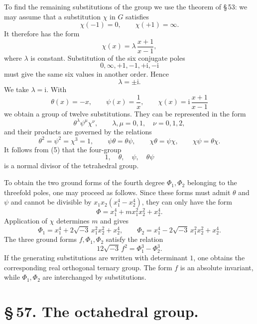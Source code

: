 \documentclass[11pt]{article}
\providecommand{\ii}{\mathrm{i}}
\begin{document}
To find the remaining substitutions of the group we use the theorem of \S\,53: we may assume that a substitution $\chi$ in $G$ satisfies
\[
 \chi(-1)=0,\qquad \chi(+1)=\infty.
\]
It therefore has the form
\begin{equation}
 \chi(x)=\lambda\,\frac{x+1}{x-1},
\tag{3}
\end{equation}
where $\lambda$ is constant. Substitution of the six conjugate poles
\[
0,\infty,+1,-1,+\ii,-\ii
\]
must give the same six values in another order. Hence
\[
 \lambda=\pm\ii .
\]
We take $\lambda=\ii$. With
\[
 \theta(x)=-x,\qquad \psi(x)=\frac1x,\qquad
 \chi(x)=\ii\,\frac{x+1}{x-1}
\]
we obtain a group of twelve substitutions. They can be represented in the form
\begin{equation}
 \theta^\lambda\psi^\mu\chi^\nu,\qquad
 \lambda,\mu=0,1,\quad \nu=0,1,2,
\tag{4}
\end{equation}
and their products are governed by the relations
\begin{equation}
 \theta^2=\psi^2=\chi^3=1,\qquad
 \psi\theta=\theta\psi,\qquad
 \chi\theta=\psi\chi,\qquad
 \chi\psi=\theta\chi .
\tag{5}
\end{equation}
It follows from (5) that the four-group
\begin{equation}
 1,\quad \theta,\quad \psi,\quad \theta\psi
\tag{6}
\end{equation}
is a normal divisor of the tetrahedral group.

To obtain the two ground forms of the fourth degree $\Phi_1,\Phi_2$ belonging to the threefold poles, one may proceed as follows. Since these forms must admit $\theta$ and $\psi$ and cannot be divisible by $x_1x_2(x_1^4-x_2^4)$, they can only have the form
\[
 \Phi=x_1^4+m x_1^2x_2^2+x_2^4 .
\]
Application of $\chi$ determines $m$ and gives
\begin{equation}
 \Phi_1=x_1^4+2\sqrt{-3}\,x_1^2x_2^2+x_2^4,\qquad
 \Phi_2=x_1^4-2\sqrt{-3}\,x_1^2x_2^2+x_2^4.
\tag{7}
\end{equation}
The three ground forms $f,\Phi_1,\Phi_2$ satisfy the relation
\begin{equation}
 12\sqrt{-3}\, f^2=\Phi_1^3-\Phi_2^3 .
\tag{8}
\end{equation}
If the generating substitutions are written with determinant $1$, one obtains the corresponding real orthogonal ternary group. The form $f$ is an absolute invariant, while $\Phi_1,\Phi_2$ are interchanged by substitutions.

\section*{\S\,57. The octahedral group.}
\end{document}
